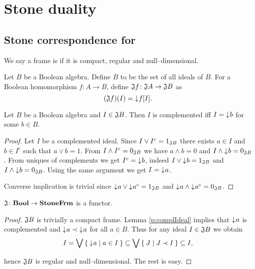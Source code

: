 \chapter{Stone duality}
\section{Stone correspondence for \StoneFrm}

\begin{definition}
    We say a frame is  if it is compact, regular and null--dimensional.
\end{definition}

\begin{definition}
    Let $B$ be a Boolean algebra. Define $B$ to be the set of all ideals of $B$.
    For a Boolean homomorphism $f\colon A \to B$, define $\mathfrak{J} f\colon \mathfrak{J} A \to \mathfrak{J} B$ as
    $$(\mathfrak{J} f)(I) = \mathord{\downarrow}\mkern1mu f[I].$$
\end{definition}

\begin{lemma}\label{p:complIdeal}
    Let $B$ be a Boolean algebra and $I \in \mathfrak{J} B$. Then $I$ is complemented iff $I = \mathord{\downarrow}\mkern1mu b$ for some $b \in B$.
\end{lemma}
\begin{proof}
    Let $I$ be a complemented ideal. Since $I \vee I^c = 1_{\mathfrak{J} B}$ there exists $a \in I$ and $b \in I^c$ such that $a \vee b = 1$. From $I \wedge I^c = 0_{\mathfrak{J} B}$ we have $a \wedge b = 0$ and $I \wedge \mathord{\downarrow}\mkern1mu b = 0_{\mathfrak{J} B}$.
    From uniques of complements we get $I^c = \mathord{\downarrow}\mkern1mu b$, indeed $I \vee \mathord{\downarrow}\mkern1mu b = 1_{\mathfrak{J} B}$ and $I \wedge \mathord{\downarrow}\mkern1mu b = 0_{\mathfrak{J} B}$. Using the same argument we get $I = \mathord{\downarrow}\mkern1mu a$.

    Converse implication is trivial since $\mathord{\downarrow}\mkern1mu a \vee \mathord{\downarrow}\mkern1mu a^c = 1_{\mathfrak{J} B}$ and $\mathord{\downarrow}\mkern1mu a \wedge \mathord{\downarrow}\mkern1mu a^c = 0_{\mathfrak{J} B}$.
\end{proof}

\begin{proposition}\label{p:JisFunctor}
    $\mathfrak{J}\colon \mathbf{Bool} \to \mathbf{StoneFrm}$ is a functor.
\end{proposition}
\begin{proof}
    $\mathfrak{J} B$ is trivially a compact frame. Lemma \ref{p:complIdeal} implies that $\mathord{\downarrow}\mkern1mu a$ is complemented and $\mathord{\downarrow}\mkern1mu a \prec \mathord{\downarrow}\mkern1mu a$ for all $a \in B$. Thus for any ideal $I \in \mathfrak{J} B$ we obtain
    $$ I = \bigvee \Set{ \mathord{\downarrow}\mkern1mua | a \in I } \subseteq \bigvee \Set{ J | J \prec I } \subseteq I,$$

\noindent hence $\mathfrak{J} B$ is regular and null--dimensional. The rest is easy.
\end{proof}


